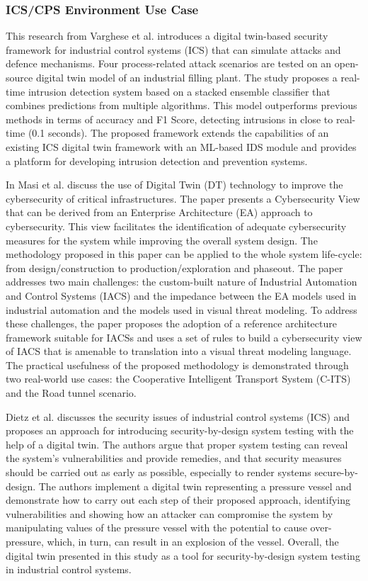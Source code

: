 \subsubsection{ICS/CPS Environment Use Case}

This\cite{vargheseDigitalTwinbasedIntrusion2022} research from Varghese et al. introduces a digital twin-based security framework for industrial control systems (ICS) that can simulate attacks and defence mechanisms. Four process-related attack scenarios are tested on an open-source digital twin model of an industrial filling plant. The study proposes a real-time intrusion detection system based on a stacked ensemble classifier that combines predictions from multiple algorithms. This model outperforms previous methods in terms of accuracy and F1 Score, detecting intrusions in close to real-time (0.1 seconds). The proposed framework extends the capabilities of an existing ICS digital twin framework with an ML-based IDS module and provides a platform for developing intrusion detection and prevention systems.


In\cite{masiSecuringCriticalInfrastructures2023} Masi et al. discuss the  use of Digital Twin (DT) technology to improve the cybersecurity of critical infrastructures. The paper presents a Cybersecurity View that can be derived from an Enterprise Architecture (EA) approach to cybersecurity. This view facilitates the identification of adequate cybersecurity measures for the system while improving the overall system design. The methodology proposed in this paper can be applied to the whole system life-cycle: from design/construction to production/exploration and phaseout. The paper addresses two main challenges: the custom-built nature of Industrial Automation and Control Systems (IACS) and the impedance between the EA models used in industrial automation and the models used in visual threat modeling. To address these challenges, the paper proposes the adoption of a reference architecture framework suitable for IACSs and uses a set of rules to build a cybersecurity view of IACS that is amenable to translation into a visual threat modeling language.  The practical usefulness of the proposed methodology is demonstrated through two real-world use cases: the Cooperative Intelligent Transport System (C-ITS) and the Road tunnel scenario. 

Dietz et al.\cite{dietzEmployingDigitalTwins2022} discusses the security issues of industrial control systems (ICS) and proposes an approach for introducing security-by-design system testing with the help of a digital twin. The authors argue that proper system testing can reveal the system’s vulnerabilities and provide remedies, and that security measures should be carried out as early as possible, especially to render systems secure-by-design. The authors implement a digital twin representing a pressure vessel and demonstrate how to carry out each step of their proposed approach, identifying vulnerabilities and showing how an attacker can compromise the system by manipulating values of the pressure vessel with the potential to cause over-pressure, which, in turn, can result in an explosion of the vessel. Overall, the digital twin presented in this study as a tool for security-by-design system testing in industrial control systems.


